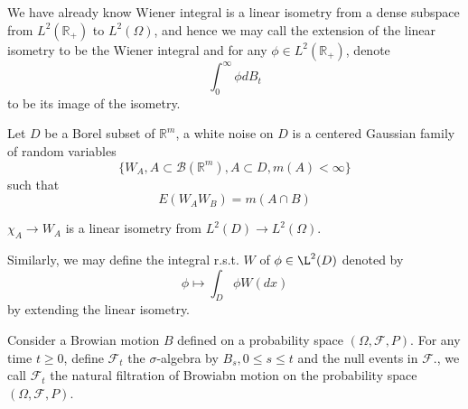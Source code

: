 \documentclass[lang=en, color=blue, ]{elegantbook}
\newcommand{\F}{\mathcal{F}}
\newcommand{\R}{\mathbb{R}}
\begin{document}
\begin{definition}
    We have already know Wiener integral is a linear isometry from a dense subspace from $L^2(\R_+)$ to $L^2(\Omega)$, and hence we may call the extension of the linear isometry to be the Wiener integral and for any $\phi \in L^2(\R_+)$, denote
    \[\int_0^{\infty} \phi dB_t\]
    to be its image of the isometry.
\end{definition}

\begin{definition}
    Let $D$ be a Borel subset of $\R^m$, a white noise on $D$ is a centered Gaussian family of random variables
    \[\{W_A, A\subset \mathcal{B}(\R^m),A\subset D, m(A)<\infty\}\]
    such that
    \[E(W_AW_B) = m(A\cap B)\]
\end{definition}

\begin{proposition}
    $\chi_A \to W_A$ is a linear isometry from $L^2(D)\to L^2(\Omega)$.
\end{proposition}

\begin{definition}
    Similarly, we may define the integral r.s.t. $W$ of $\phi\in\L^2(D)$ denoted by
    \[\phi \mapsto \int_D \phi W(dx)\]
    by extending the linear isometry.
\end{definition}

\begin{definition}
    Consider a Browian motion $B$ defined on a probability space $(\Omega,\F,P)$. For any time $t\geq 0$, define $\F_t$ the $\sigma$-algebra by $B_s, 0 \leq s \leq t$ and the null events in $\F$., we call $\F_t$ the natural filtration of Browiabn motion on the probability space $(\Omega, \F,P)$. 
\end{definition}
\end{document}
